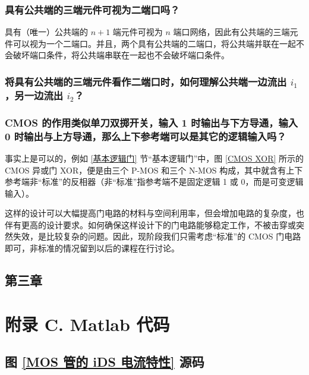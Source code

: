 \documentclass[UTF8]{report}
\theoremstyle{MyLineTheoremStyle} %
\theoremstyle{MyBlockTheoremStyle} %
\theoremstyle{MySubsubsectionStyle} %
\begin{document}
\subsection{具有公共端的三端元件可视为二端口吗？}

具有（唯一）公共端的 $n+1$ 端元件可视为 $n$ 端口网络，因此有公共端的三端元件可以视为一个二端口。并且，两个具有公共端的二端口，将公共端并联在一起不会破坏端口条件，将公共端串联在一起也不会破坏端口条件。

\subsection{将具有公共端的三端元件看作二端口时，如何理解公共端一边流出 $i_1$，另一边流出 $i_2$？}

\subsection{CMOS 的作用类似单刀双掷开关，输入 1 时输出与下方导通，输入 0 时输出与上方导通，那么上下参考端可以是其它的逻辑输入吗？}

事实上是可以的，例如 \ref{基本逻辑门} 节“基本逻辑门”中，图 \ref{CMOS XOR} 所示的 CMOS 异或门 XOR，便是由三个 P-MOS 和三个 N-MOS 构成，其中就含有上下参考端非“标准”的反相器（非“标准”指参考端不是固定逻辑 1 或 0，而是可变逻辑输入）。

这样的设计可以大幅提高门电路的材料与空间利用率，但会增加电路的复杂度，也伴有更高的设计要求。如何确保这样设计下的门电路能够稳定工作，不被击穿或突然失效，是比较复杂的问题。因此，现阶段我们只需考虑“标准”的 CMOS 门电路即可，非标准的情况留到以后的课程在行讨论。


\section{第三章}
















\chapter*{附录 C. Matlab 代码}   
\thispagestyle{fancy} 
\setcounter{chapter}{3} 
\setcounter{section}{0}   
\renewcommand\thesection{C.\arabic{section}}   
\renewcommand{\thefigure}{C.\arabic{figure}} 
\renewcommand{\thetable}{C.\arabic{table}}

\section{图 \ref{MOS 管的 iDS 电流特性} 源码}
\label{MOS 管的 iDS 电流特性 源码}

\end{document}
